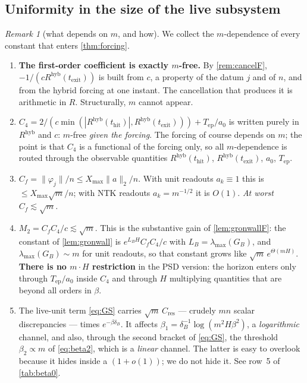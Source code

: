 \documentclass[11pt]{article}
\theoremstyle{definition}
\theoremstyle{remark}
\newtheorem{remark}[remark]{Remark}
\newcommand{\thit}{t_{\mathrm{hit}}}
\newcommand{\texit}{t_{\mathrm{exit}}}
\newcommand{\Tep}{T_{\mathrm{ep}}}   %
\newcommand{\hyb}{\mathrm{hyb}}
\begin{document}
\subsection{Uniformity in the size of the live
subsystem}\label{app:forcing-uniform}

\begin{remark}[what depends on $m$, and how]\label{rem:uniformF}
We collect the $m$-dependence of every constant that enters
\cref{thm:forcing}.
\begin{enumerate}
\item[(U1)] \textbf{The first-order coefficient is exactly $m$-free.} By
\cref{rem:cancelF}, $-1/(cR^{\hyb}(\texit))$ is built from $c$, a property of
the datum $j$ and of $n$, and from the hybrid forcing at one instant. The
cancellation that produces it is arithmetic in $R$. Structurally, $m$ cannot
appear.
\item[(U2)] $C_4=2/(c\min(|R^{\hyb}(\thit)|,R^{\hyb}(\texit)))+\Tep/a_0$ is
written purely in $R^{\hyb}$ and $c$: $m$-free \emph{given the forcing}. The
forcing of course depends on $m$; the point is that $C_4$ is a functional of the
forcing only, so all $m$-dependence is routed through the observable quantities
$R^{\hyb}(\thit)$, $R^{\hyb}(\texit)$, $a_0$, $\Tep$.
\item[(U3)] $C_f=\|\varphi_j\|/n\le X_{\max}\|a\|_2/n$. With unit readouts
$a_k\equiv1$ this is $\le X_{\max}\sqrt m/n$; with NTK readouts $a_k=m^{-1/2}$
it is $O(1)$. \emph{At worst $C_f\lesssim\sqrt m$.}
\item[(U4)] $M_2=C_fC_4/c\lesssim\sqrt m$. This is the substantive gain of
\cref{lem:gronwallF}: the constant of \cref{lem:gronwall} is $e^{L_BH}C_fC_4/c$
with $L_B=\lambda_{\max}(G_B)$, and $\lambda_{\max}(G_B)\sim m$ for unit
readouts, so that constant grows like $\sqrt m\,e^{\Theta(mH)}$. \textbf{There
is no $m\cdot H$ restriction} in the PSD version: the horizon enters only
through $\Tep/a_0$ inside $C_4$ and through $H$ multiplying quantities that are
beyond all orders in $\beta$.
\item[(U5)] The live-unit term \eqref{eq:GS} carries $\sqrt m\,C_{\mathrm{res}}$
--- crudely $mn$ scalar discrepancies --- times $e^{-\beta\delta_B}$. It affects
$\beta_1=\delta_B^{-1}\log(m^2H\beta^2)$, a \emph{logarithmic} channel, and
also, through the second bracket of \eqref{eq:GS}, the threshold
$\beta_2\propto m$ of \eqref{eq:beta2}, which is a \emph{linear} channel. The
latter is easy to overlook because it hides inside a $(1+o(1))$; we do not hide
it. See row~5 of \cref{tab:beta0}.

\end{enumerate}
\end{remark}
\end{document}

